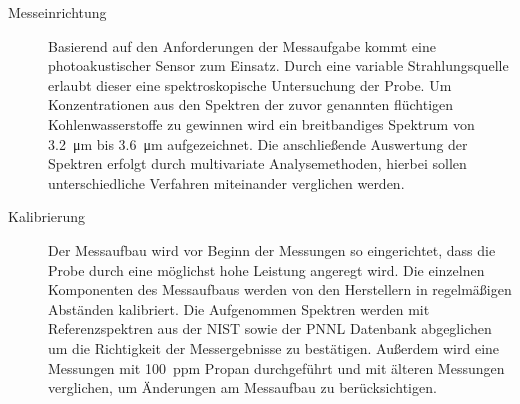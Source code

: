 \begin{description}
    \item[Messeinrichtung] %
        Basierend auf den Anforderungen der Messaufgabe kommt eine photoakustischer Sensor zum Einsatz.
        Durch eine variable Strahlungsquelle erlaubt dieser eine spektroskopische Untersuchung der Probe.
        Um Konzentrationen aus den Spektren der zuvor genannten flüchtigen Kohlenwasserstoffe zu gewinnen wird ein breitbandiges Spektrum von \SI{3.2}{\micro\meter} bis \SI{3.6}{\micro\meter} aufgezeichnet. 
        Die anschließende Auswertung der Spektren erfolgt durch multivariate Analysemethoden, hierbei sollen unterschiedliche Verfahren miteinander verglichen werden.
    
    \item[Kalibrierung] %
        Der Messaufbau wird vor Beginn der Messungen so eingerichtet, dass die Probe durch eine möglichst hohe Leistung angeregt wird.
        Die einzelnen Komponenten des Messaufbaus werden von den Herstellern in regelmäßigen Abständen kalibriert. 
        Die Aufgenommen Spektren werden mit Referenzspektren aus der \gls{NIST} sowie der \gls{PNNL} Datenbank abgeglichen um die Richtigkeit der Messergebnisse zu bestätigen.
        Außerdem wird eine Messungen mit \SI{100}{ppm} Propan durchgeführt und mit älteren Messungen verglichen, um Änderungen am Messaufbau zu berücksichtigen.
        

\end{description}
